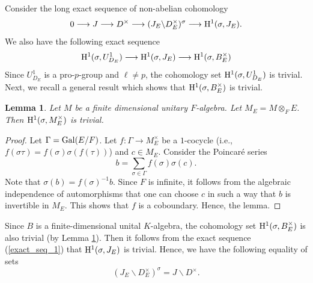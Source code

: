 \documentclass[10pt, reqno]{amsart}
\theoremstyle{plain}
\numberwithin{equation}{section}
\newtheorem{lemma}[theorem]{Lemma}
\begin{document}
\subsubsection{}
Consider the long exact sequence of non-abelian cohomology
$$ 0\longrightarrow J\longrightarrow D^\times\longrightarrow (J_E\backslash D_E^\times)^\sigma\longrightarrow {\rm H}^1(\sigma, J_E). $$
We also have the following exact sequence
\begin{equation}\label{exact_seq_1}
{\rm H}^1(\sigma,U_{D_E}^1)\longrightarrow {\rm H}^1(\sigma,J_E)\longrightarrow {\rm H}^1(\sigma,B_E^\times)
\end{equation}
Since $U_{D_E}^1$ is a pro-$p$-group and $\ell\ne p$, the cohomology set ${\rm H}^1(\sigma, U_{D_E}^1)$ is trivial. Next, we recall a general result which shows that ${\rm H}^1(\sigma,B_E^\times)$ is trivial. 
\begin{lemma}\label{cohom_triv}
Let $M$ be a finite dimensional unitary $F$-algebra. Let $M_E = M\otimes_F E$. Then ${\rm H}^1(\sigma,M_E^\times)$ is trivial.
\end{lemma}
\begin{proof}
Let $\Gamma = {\rm Gal}(E/F)$. Let $f:\Gamma\rightarrow M_E^\times$ be a $1$-cocycle (i.e., $f(\sigma\tau)=f(\sigma)\sigma(f(\tau))$) and $c\in M_E$. Consider the Poincar\'e series
$$ b= \sum_{\sigma\in\Gamma}f(\sigma)\sigma(c). $$
Note that $\sigma(b) = f(\sigma)^{-1} b$. Since $F$ is infinite, it follows from the algebraic independence of automorphisms \cite[Chapter 5, Section 10, Theorem 4]{bourbaki2003algebra} that one can choose $c$ in such a way that $b$ is invertible in $M_E$. This shows that $f$ is a coboundary. Hence, the lemma.
\end{proof}
Since $B$ is a finite-dimensional unital $K$-algebra, the cohomology set ${\rm H}^1(\sigma, B_E^\times)$ is also trivial (by Lemma \ref{cohom_triv}). Then it follows from the exact sequence (\ref{exact_seq_1}) that ${\rm H}^1(\sigma,J_E)$ is trivial. Hence, we have the following equality of sets
\begin{equation}\label{coset_equal}
(J_E\backslash D_E^\times)^\sigma = 
J\backslash D^\times.
\end{equation}
\end{document}
